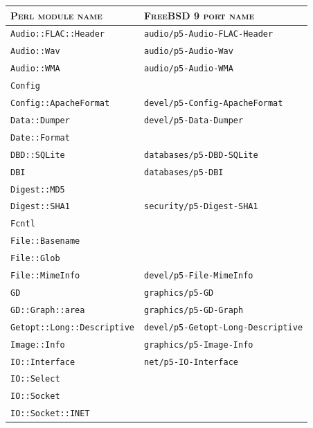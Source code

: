 \documentclass[a4paper,oneside,10pt]{report}
\begin{document}
\begin{table}
	\centering
	\begin{tabular}{|p{15em}|p{18em}|}
		\hline
		\textsc{Perl module name} 						&  \textsc{FreeBSD 9 port name}\\
		\hline
		\hline
		\verb|Audio::FLAC::Header| 						& \verb|audio/p5-Audio-FLAC-Header| \\
		\hline
		\verb|Audio::Wav| 										& \verb|audio/p5-Audio-Wav| \\
		\hline
		\verb|Audio::WMA| 										& \verb|audio/p5-Audio-WMA| \\
		\hline
		\verb|Config| 												& \\
		\hline
		\verb|Config::ApacheFormat|						& \verb|devel/p5-Config-ApacheFormat| \\
		\hline
		\verb|Data::Dumper| 									& \verb|devel/p5-Data-Dumper| \\
		\hline
		\verb|Date::Format| 									&	\\
		\hline
		\verb|DBD::SQLite|										& \verb|databases/p5-DBD-SQLite| \\
		\hline
		\verb|DBI|														& \verb|databases/p5-DBI| \\
		\hline
		\verb|Digest::MD5| 										& \\
		\hline
		\verb|Digest::SHA1| 									& \verb|security/p5-Digest-SHA1| \\
		\hline
		\verb|Fcntl| 													& \\
		\hline
		\verb|File::Basename| 								& \\
		\hline
		\verb|File::Glob| 										& \\
		\hline
		\verb|File::MimeInfo| 								& \verb|devel/p5-File-MimeInfo| \\
		\hline
		\verb|GD| 														& \verb|graphics/p5-GD| \\
		\hline
		\verb|GD::Graph::area| 								& \verb|graphics/p5-GD-Graph| \\
		\hline
		\verb|Getopt::Long::Descriptive| 			& \verb|devel/p5-Getopt-Long-Descriptive| \\
		\hline
		\verb|Image::Info| 										& \verb|graphics/p5-Image-Info| \\
		\hline
		\verb|IO::Interface| 									& \verb|net/p5-IO-Interface| \\
		\hline
		\verb|IO::Select| 										& \\
		\hline
		\verb|IO::Socket| 										& \\
		\hline
		\verb|IO::Socket::INET| 							& \\

\end{tabular}
\end{table}
\end{document}
